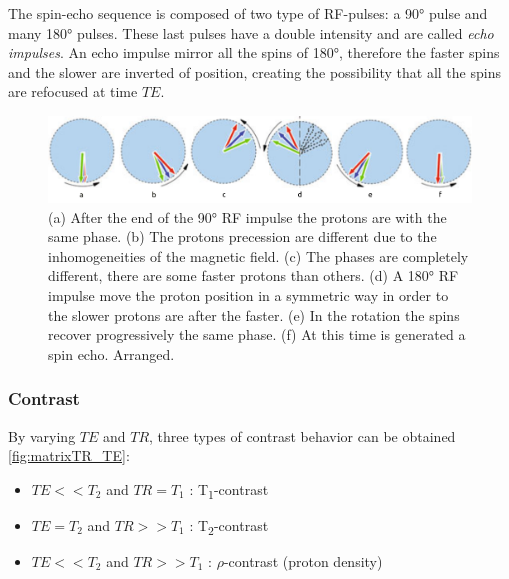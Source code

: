  \noindent The spin-echo sequence is composed of two type of RF-pulses: a 90° pulse and many 180° pulses. These last pulses have a double intensity and are called \emph{echo impulses}. An echo impulse mirror all the spins of 180°, therefore the faster spins and the slower are inverted of position, creating the possibility that all the spins are refocused at time $TE$.

 \begin{figure}[h]
   \centering
   \includegraphics[width=1\textwidth]{images/t2_relax.png}
   \caption{(a) After the end of the 90° RF impulse the protons are with the same phase. (b) The protons precession are different due to the inhomogeneities of the magnetic field. (c) The phases are completely different, there are some faster protons than others. (d) A 180° RF impulse move the proton position in a symmetric way in order to the slower protons are after the faster. (e) In the rotation the spins recover progressively the same phase. (f) At this time is generated a spin echo. \cite{elementiRisonanza} Arranged.}
   \label{fig:T2_relax}
 \end{figure}

 \subsubsection*{Contrast}
 By varying $TE$ and $TR$, three types of contrast behavior can be obtained \ref{fig:matrixTR_TE}:
 \begin{itemize}
    \item $TE<<T_2$ and $TR=T_1$ : T\textsubscript{1}-contrast
    \item $TE=T_2$ and $TR>>T_1$ : T\textsubscript{2}-contrast
    \item $TE<<T_2$ and $TR>>T_1$ : $\rho$-contrast (proton density)
 \end{itemize}


